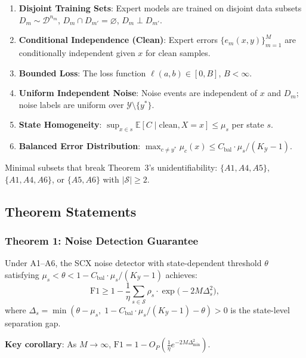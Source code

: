 \documentclass{article}
\begin{document}
\begin{enumerate}
\item[A1] \textbf{Disjoint Training Sets}: Expert models are trained on disjoint data subsets $D_m \sim \mathcal{D}^{n_m}$, $D_m \cap D_{m'} = \varnothing$, $D_m \perp D_{m'}$.
\item[A2] \textbf{Conditional Independence (Clean)}: Expert errors $\{e_m(x,y)\}_{m=1}^M$ are conditionally independent given $x$ for clean samples.
\item[A3] \textbf{Bounded Loss}: The loss function $\ell(a,b) \in [0, B]$, $B < \infty$.
\item[A4] \textbf{Uniform Independent Noise}: Noise events are independent of $x$ and $D_m$; noise labels are uniform over $\mathcal{Y}\setminus\{y^*\}$.
\item[A5] \textbf{State Homogeneity}: $\sup_{x\in s} \mathbb{E}[C \mid \text{clean}, X=x] \leq \mu_s$ per state $s$.
\item[A6] \textbf{Balanced Error Distribution}: $\max_{c\neq y^*} \mu_c(x) \leq C_{\text{bal}} \cdot \mu_s/(K_{\mathcal{Y}}-1)$.
\end{enumerate}

Minimal subsets that break Theorem~3's unidentifiability: $\{A1, A4, A5\}$, $\{A1, A4, A6\}$, or $\{A5, A6\}$ with $|\mathcal{S}| \geq 2$.

\subsection{Theorem Statements}
\label{sec:theorems}

\subsubsection*{Theorem 1: Noise Detection Guarantee}
Under A1--A6, the SCX noise detector with state-dependent threshold $\theta$ satisfying $\mu_s < \theta < 1 - C_{\text{bal}}\cdot\mu_s/(K_{\mathcal{Y}}-1)$ achieves:
\begin{equation}
\text{F1} \geq 1 - \frac{1}{\eta}\sum_{s\in\mathcal{S}} \rho_s \cdot \exp\bigl(-2M\Delta_s^2\bigr),
\end{equation}
where $\Delta_s = \min(\theta - \mu_s,\; 1 - C_{\text{bal}}\cdot\mu_s/(K_{\mathcal{Y}}-1) - \theta) > 0$ is the state-level separation gap.

\textbf{Key corollary}: As $M \to \infty$, $\text{F1} = 1 - O_P(\frac{1}{\eta} e^{-2M\Delta_{\min}^2})$.
\end{document}
